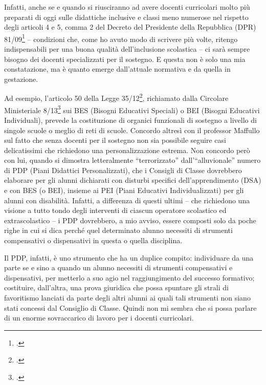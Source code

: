 Infatti, anche se e quando si riusciranno ad avere docenti curricolari molto più preparati di oggi sulle didattiche inclusive e classi meno numerose nel rispetto degli articoli 4 e 5, comma 2 del Decreto del Presidente della Repubblica (DPR) 81/09\footcite{DPR_81_2009} – condizioni che, come ho avuto modo di scrivere più volte, ritengo indispensabili per una buona qualità dell'inclusione scolastica – ci sarà sempre bisogno dei docenti specializzati per il sostegno. E questa non è solo una mia constatazione, ma è quanto emerge dall'attuale normativa e da quella in gestazione.

Ad esempio, l'articolo 50 della Legge 35/12\footcite{Legge_35_2012}, richiamato dalla Circolare Ministeriale 8/13\footcite{cm8_2013} sui BES (Bisogni Educativi Speciali) o BEI (Bisogni Educativi Individuali), prevede la costituzione di organici funzionali di sostegno a livello di singole scuole o meglio di reti di scuole.
Concordo altresì con il professor Maffullo sul fatto che senza docenti per il sostegno non sia possibile seguire casi delicatissimi che richiedono una personalizzazione estrema. Non concordo però con lui, quando si dimostra letteralmente “terrorizzato” dall'“alluvionale” numero di PDP (Piani Didattici Personalizzati), che i Consigli di Classe dovrebbero elaborare per gli alunni dichiarati con disturbi specifici dell'apprendimento (DSA) e con BES (o BEI), insieme ai PEI (Piani Educativi Individualizzati) per gli alunni con disabilità. Infatti, a differenza di questi ultimi – che richiedono una visione a tutto tondo degli interventi di ciascun operatore scolastico ed extrascolastico – i PDP dovrebbero, a mio avviso, essere composti solo da poche righe in cui si dica perché quel determinato alunno necessiti di strumenti compensativi o dispensativi in questa o quella disciplina.

Il PDP, infatti, è uno strumento che ha un duplice compito: individuare da una parte se e sino a quando un alunno necessiti di strumenti compensativi e dispensativi, per metterlo a suo agio nel raggiungimento del successo formativo; costituire, dall'altra, una prova giuridica che possa spuntare gli strali di favoritismo lanciati da parte degli altri alunni ai quali tali strumenti non siano stati concessi dal Consiglio di Classe. Quindi non mi sembra che si possa parlare di un enorme sovraccarico di lavoro per i docenti curricolari.

